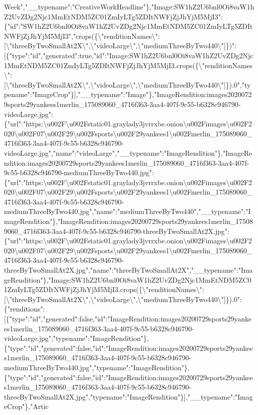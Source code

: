 Week","\_\_typename":"CreativeWorkHeadline"\},"Image:SW1hZ2U6bnl0Oi8vaW1hZ2UvZDg2Njc1MmEtNDM5ZC01ZmIyLTg5ZDItNWFjZjJhYjM5MjI3":\{"id":"SW1hZ2U6bnl0Oi8vaW1hZ2UvZDg2Njc1MmEtNDM5ZC01ZmIyLTg5ZDItNWFjZjJhYjM5MjI3","crops(\{\textbackslash{}"renditionNames\textbackslash{}":{[}\textbackslash{}"threeByTwoSmallAt2X\textbackslash{}",\textbackslash{}"videoLarge\textbackslash{}",\textbackslash{}"mediumThreeByTwo440\textbackslash{}"{]}\})":{[}\{"type":"id","generated":true,"id":"Image:SW1hZ2U6bnl0Oi8vaW1hZ2UvZDg2Njc1MmEtNDM5ZC01ZmIyLTg5ZDItNWFjZjJhYjM5MjI3.crops(\{\textbackslash{}"renditionNames\textbackslash{}":{[}\textbackslash{}"threeByTwoSmallAt2X\textbackslash{}",\textbackslash{}"videoLarge\textbackslash{}",\textbackslash{}"mediumThreeByTwo440\textbackslash{}"{]}\}).0","typename":"ImageCrop"\}{]},"\_\_typename":"Image"\},"ImageRendition:images20200729sports29yankees1merlin\_175089060\_4716f363-3aa4-407f-9c55-b6328c946790-videoLarge.jpg":\{"url":"https:\textbackslash{}u002F\textbackslash{}u002Fstatic01.graylady3jvrrxbe.onion\textbackslash{}u002Fimages\textbackslash{}u002F2020\textbackslash{}u002F07\textbackslash{}u002F29\textbackslash{}u002Fsports\textbackslash{}u002F29yankees1\textbackslash{}u002Fmerlin\_175089060\_4716f363-3aa4-407f-9c55-b6328c946790-videoLarge.jpg","name":"videoLarge","\_\_typename":"ImageRendition"\},"ImageRendition:images20200729sports29yankees1merlin\_175089060\_4716f363-3aa4-407f-9c55-b6328c946790-mediumThreeByTwo440.jpg":\{"url":"https:\textbackslash{}u002F\textbackslash{}u002Fstatic01.graylady3jvrrxbe.onion\textbackslash{}u002Fimages\textbackslash{}u002F2020\textbackslash{}u002F07\textbackslash{}u002F29\textbackslash{}u002Fsports\textbackslash{}u002F29yankees1\textbackslash{}u002Fmerlin\_175089060\_4716f363-3aa4-407f-9c55-b6328c946790-mediumThreeByTwo440.jpg","name":"mediumThreeByTwo440","\_\_typename":"ImageRendition"\},"ImageRendition:images20200729sports29yankees1merlin\_175089060\_4716f363-3aa4-407f-9c55-b6328c946790-threeByTwoSmallAt2X.jpg":\{"url":"https:\textbackslash{}u002F\textbackslash{}u002Fstatic01.graylady3jvrrxbe.onion\textbackslash{}u002Fimages\textbackslash{}u002F2020\textbackslash{}u002F07\textbackslash{}u002F29\textbackslash{}u002Fsports\textbackslash{}u002F29yankees1\textbackslash{}u002Fmerlin\_175089060\_4716f363-3aa4-407f-9c55-b6328c946790-threeByTwoSmallAt2X.jpg","name":"threeByTwoSmallAt2X","\_\_typename":"ImageRendition"\},"Image:SW1hZ2U6bnl0Oi8vaW1hZ2UvZDg2Njc1MmEtNDM5ZC01ZmIyLTg5ZDItNWFjZjJhYjM5MjI3.crops(\{\textbackslash{}"renditionNames\textbackslash{}":{[}\textbackslash{}"threeByTwoSmallAt2X\textbackslash{}",\textbackslash{}"videoLarge\textbackslash{}",\textbackslash{}"mediumThreeByTwo440\textbackslash{}"{]}\}).0":\{"renditions":{[}\{"type":"id","generated":false,"id":"ImageRendition:images20200729sports29yankees1merlin\_175089060\_4716f363-3aa4-407f-9c55-b6328c946790-videoLarge.jpg","typename":"ImageRendition"\},\{"type":"id","generated":false,"id":"ImageRendition:images20200729sports29yankees1merlin\_175089060\_4716f363-3aa4-407f-9c55-b6328c946790-mediumThreeByTwo440.jpg","typename":"ImageRendition"\},\{"type":"id","generated":false,"id":"ImageRendition:images20200729sports29yankees1merlin\_175089060\_4716f363-3aa4-407f-9c55-b6328c946790-threeByTwoSmallAt2X.jpg","typename":"ImageRendition"\}{]},"\_\_typename":"ImageCrop"\},"Artic